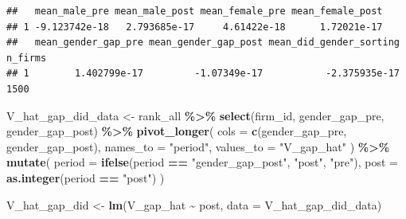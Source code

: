 \documentclass[
]{article}
\newenvironment{Shaded}{\begin{snugshade}}{\end{snugshade}}
\newcommand{\AttributeTok}[1]{\textcolor[rgb]{0.13,0.29,0.53}{#1}}
\newcommand{\FunctionTok}[1]{\textcolor[rgb]{0.13,0.29,0.53}{\textbf{#1}}}
\newcommand{\NormalTok}[1]{#1}
\newcommand{\OtherTok}[1]{\textcolor[rgb]{0.56,0.35,0.01}{#1}}
\newcommand{\SpecialCharTok}[1]{\textcolor[rgb]{0.81,0.36,0.00}{\textbf{#1}}}
\newcommand{\StringTok}[1]{\textcolor[rgb]{0.31,0.60,0.02}{#1}}
\begin{document}
\begin{verbatim}
##   mean_male_pre mean_male_post mean_female_pre mean_female_post
## 1 -9.123742e-18   2.793685e-17     4.61422e-18      1.72021e-17
##   mean_gender_gap_pre mean_gender_gap_post mean_did_gender_sorting n_firms
## 1        1.402799e-17         -1.07349e-17           -2.375935e-17    1500
\end{verbatim}

\begin{Shaded}
\begin{Highlighting}[]
\NormalTok{V\_hat\_gap\_did\_data }\OtherTok{\textless{}{-}}\NormalTok{ rank\_all }\SpecialCharTok{\%\textgreater{}\%}
    \FunctionTok{select}\NormalTok{(firm\_id, gender\_gap\_pre, gender\_gap\_post) }\SpecialCharTok{\%\textgreater{}\%}
    \FunctionTok{pivot\_longer}\NormalTok{(}
        \AttributeTok{cols =} \FunctionTok{c}\NormalTok{(gender\_gap\_pre, gender\_gap\_post),}
        \AttributeTok{names\_to =} \StringTok{"period"}\NormalTok{,}
        \AttributeTok{values\_to =} \StringTok{"V\_gap\_hat"}
\NormalTok{    ) }\SpecialCharTok{\%\textgreater{}\%}
    \FunctionTok{mutate}\NormalTok{(}
        \AttributeTok{period =} \FunctionTok{ifelse}\NormalTok{(period }\SpecialCharTok{==} \StringTok{"gender\_gap\_post"}\NormalTok{, }\StringTok{"post"}\NormalTok{, }\StringTok{"pre"}\NormalTok{),}
        \AttributeTok{post =} \FunctionTok{as.integer}\NormalTok{(period }\SpecialCharTok{==} \StringTok{"post"}\NormalTok{)}
\NormalTok{    )}

\NormalTok{V\_hat\_gap\_did }\OtherTok{\textless{}{-}} \FunctionTok{lm}\NormalTok{(V\_gap\_hat }\SpecialCharTok{\textasciitilde{}}\NormalTok{ post, }\AttributeTok{data =}\NormalTok{ V\_hat\_gap\_did\_data)}


\end{Highlighting}
\end{Shaded}
\end{document}
